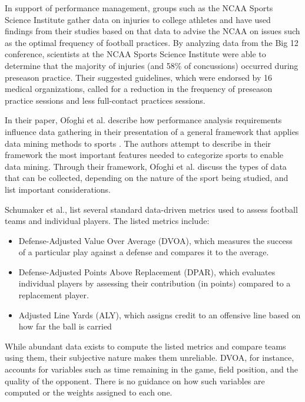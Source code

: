 \documentclass[sigconf]{acmart}
\begin{document}
In support of performance management, groups such as the NCAA Sports Science Institute gather data on injuries to college athletes and have used findings from their studies based on that data to advise the NCAA on issues such as the optimal frequency of football practices\cite{Solomon2017}. By analyzing data from the Big 12 conference, scientists at the NCAA Sports Science Institute were able to determine that the majority of injuries (and 58\% of concussions) occurred during preseason practice. Their suggested guidelines, which were endorsed by 16 medical organizations, called for a reduction in the frequency of preseason practice sessions and less full-contact practices sessions.

In their paper, Ofoghi et al. describe how performance analysis requirements influence data gathering in their presentation of a general framework that applies data mining methods to sports \cite{Ofoghi2013}. The authors attempt to describe in their framework the most important features needed to categorize sports to enable data mining. Through their framework, Ofoghi et al. discuss the types of data that can be collected, depending on the nature of the sport being studied, and list important considerations. 

Schumaker et al., list several standard data-driven metrics used to assess football teams and individual players\cite{Shumaker2010}. The listed metrics include:
\begin{itemize}
  \item Defense-Adjusted Value Over Average (DVOA), which measures the success of a particular play against a defense and compares it to the average. 
  \item Defense-Adjusted Points Above Replacement (DPAR), which evaluates individual players by assessing their contribution (in points) compared to a replacement player. 
  \item Adjusted Line Yards (ALY), which assigns credit to an offensive line based on how far the ball is carried
\end{itemize}

While abundant data exists to compute the listed metrics and compare teams using them, their subjective nature makes them unreliable. DVOA, for instance, accounts for variables such as time remaining in the game, field position, and the quality of the opponent. There is no guidance on how such variables are computed or the weights assigned to each one.
\end{document}
